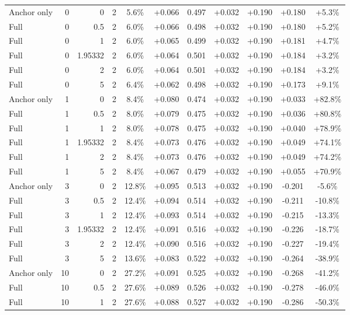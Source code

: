 \begin{table}[htbp]
\begin{tabular}{lrrrccccccc}
Anchor only & 0 & 0 & 2 & 5.6\% & +0.066 & 0.497 & +0.032 & +0.190 & +0.180 & +5.3\% \\
Full & 0 & 0.5 & 2 & 6.0\% & +0.066 & 0.498 & +0.032 & +0.190 & +0.180 & +5.2\% \\
Full & 0 & 1 & 2 & 6.0\% & +0.065 & 0.499 & +0.032 & +0.190 & +0.181 & +4.7\% \\
Full & 0 & 1.95332 & 2 & 6.0\% & +0.064 & 0.501 & +0.032 & +0.190 & +0.184 & +3.2\% \\
Full & 0 & 2 & 2 & 6.0\% & +0.064 & 0.501 & +0.032 & +0.190 & +0.184 & +3.2\% \\
Full & 0 & 5 & 2 & 6.4\% & +0.062 & 0.498 & +0.032 & +0.190 & +0.173 & +9.1\% \\
Anchor only & 1 & 0 & 2 & 8.4\% & +0.080 & 0.474 & +0.032 & +0.190 & +0.033 & +82.8\% \\
Full & 1 & 0.5 & 2 & 8.0\% & +0.079 & 0.475 & +0.032 & +0.190 & +0.036 & +80.8\% \\
Full & 1 & 1 & 2 & 8.0\% & +0.078 & 0.475 & +0.032 & +0.190 & +0.040 & +78.9\% \\
Full & 1 & 1.95332 & 2 & 8.4\% & +0.073 & 0.476 & +0.032 & +0.190 & +0.049 & +74.1\% \\
Full & 1 & 2 & 2 & 8.4\% & +0.073 & 0.476 & +0.032 & +0.190 & +0.049 & +74.2\% \\
Full & 1 & 5 & 2 & 8.4\% & +0.067 & 0.479 & +0.032 & +0.190 & +0.055 & +70.9\% \\
Anchor only & 3 & 0 & 2 & 12.8\% & +0.095 & 0.513 & +0.032 & +0.190 & -0.201 & -5.6\% \\
Full & 3 & 0.5 & 2 & 12.4\% & +0.094 & 0.514 & +0.032 & +0.190 & -0.211 & -10.8\% \\
Full & 3 & 1 & 2 & 12.4\% & +0.093 & 0.514 & +0.032 & +0.190 & -0.215 & -13.3\% \\
Full & 3 & 1.95332 & 2 & 12.4\% & +0.091 & 0.516 & +0.032 & +0.190 & -0.226 & -18.7\% \\
Full & 3 & 2 & 2 & 12.4\% & +0.090 & 0.516 & +0.032 & +0.190 & -0.227 & -19.4\% \\
Full & 3 & 5 & 2 & 13.6\% & +0.083 & 0.522 & +0.032 & +0.190 & -0.264 & -38.9\% \\
Anchor only & 10 & 0 & 2 & 27.2\% & +0.091 & 0.525 & +0.032 & +0.190 & -0.268 & -41.2\% \\
Full & 10 & 0.5 & 2 & 27.6\% & +0.089 & 0.526 & +0.032 & +0.190 & -0.278 & -46.0\% \\
Full & 10 & 1 & 2 & 27.6\% & +0.088 & 0.527 & +0.032 & +0.190 & -0.286 & -50.3\% \\

\end{tabular}
\end{table}
